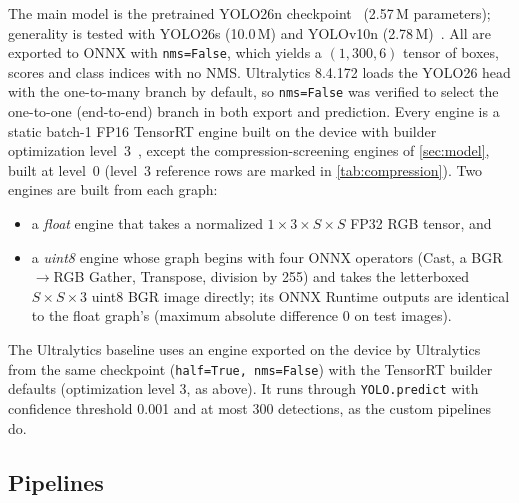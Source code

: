 The main model is the pretrained YOLO26n
checkpoint~\cite{jocher2026yolo26} (2.57\,M parameters); generality is
tested with YOLO26s (10.0\,M) and YOLOv10n
(2.78\,M)~\cite{wang2024yolov10}. All are exported to ONNX with
\texttt{nms=False}, which yields a $(1,300,6)$ tensor of boxes, scores
and class indices with no NMS. Ultralytics 8.4.172 loads the YOLO26
head with the one-to-many branch by default, so \texttt{nms=False} was
verified to select the one-to-one (end-to-end) branch in both export
and prediction. Every engine is a
static batch-1 FP16 TensorRT engine built on the device with builder
optimization level~3~\cite{nvidia2024tensorrt}, except the
compression-screening engines of \cref{sec:model}, built at level~0
(level~3 reference rows are marked in \cref{tab:compression}). Two
engines are built from each graph:
\begin{itemize}
\item a \emph{float} engine that takes a normalized
  $1{\times}3{\times}S{\times}S$ FP32 RGB tensor, and
\item a \emph{uint8} engine whose graph begins with four ONNX operators
  (Cast, a BGR$\to$RGB Gather, Transpose, division by 255) and takes the
  letterboxed $S{\times}S{\times}3$ uint8 BGR image directly; its ONNX
  Runtime outputs are identical to the float graph's (maximum absolute
  difference 0 on test images).
\end{itemize}
The Ultralytics baseline uses an engine exported on the device by
Ultralytics from the same checkpoint (\texttt{half=True, nms=False})
with the TensorRT builder defaults (optimization level 3, as above). It
runs through \texttt{YOLO.predict} with confidence threshold 0.001 and
at most 300 detections, as the custom pipelines do.

\subsection{Pipelines}
\label{sec:pipelines}

